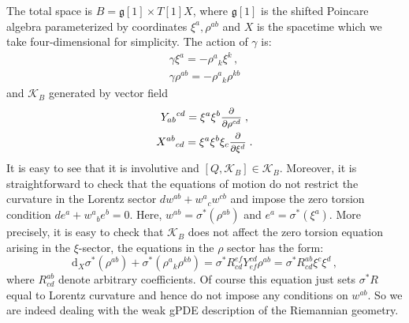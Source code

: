 \documentclass[a4paper,12pt]{article}
\numberwithin{equation}{section} %
\newcommand{\dx}{\mathrm{d}_X}
\renewcommand{\d}{\partial}
\newcommand{\ffrac}[2]{\raisebox{.5pt}%
  {\footnotesize$\displaystyle\frac{#1}{#2}$}\kern1pt}
\newcommand{\ddl}[2]{\ffrac{\d #1}{\d #2}}
\def\cK{\mathcal{K}}
\newcommand{\lorcon}{w}
\begin{document}
The total space is $B = \mathfrak{g}[1] \times T[1]X$, where $\mathfrak{g}[1]$ is the shifted Poincare algebra parameterized by coordinates $\xi^a, \rho^{ab}$ and $X$ is the spacetime which we take four-dimensional for simplicity. The action of $\gamma$ is:
\begin{equation}
    \begin{gathered}
        \gamma \xi^a = -\rho^{a}{ }_k \xi^k\,, \\
        \gamma \rho^{ab} = -\rho^{a}{ }_k \rho^{kb}
    \end{gathered}
\end{equation}
and $\cK_B$ generated by vector field
\begin{equation} \label{K-Riemann}
\begin{gathered}
    Y_{ab}{ }^{cd} = \xi^a \xi^b \ddl{}{\rho^{cd}} \,,\\
    X^{ab}{ }_{cd} = \xi^a \xi^b \xi_c \ddl{}{\xi^d}\,.
\end{gathered}
\end{equation}
It is easy to see that it is involutive and $[Q,\cK_B] \in \cK_B$. Moreover, it is straightforward to check that the equations of motion do not restrict the curvature in the Lorentz sector $d\lorcon^{ab}+\lorcon^{a}{}_c\lorcon^{cb}$ and impose the zero torsion condition $de^a+\lorcon^a{}_{b} e^b=0$. Here, $\lorcon^{ab}=\sigma^*(\rho^{ab})$ and $e^a=\sigma^*(\xi^{a})$. More precisely, it is easy to check that $\cK_B$ does not affect the zero torsion equation arising in the $\xi$-sector, the equations in the $\rho$ sector has the form:
\begin{equation}
\dx\sigma^*(\rho^{ab}) + \sigma^*(\rho^a{}_k \rho^{kb})=\sigma^*{}R^{ef}_{cd}Y^{cd}_{ef}\rho^{ab}=
\sigma^*{}R^{ab}_{cd}\xi^c\xi^d\,,
\end{equation}
where $R^{ab}_{cd}$ denote arbitrary coefficients. Of course this equation just sets $\sigma^* R$ equal to Lorentz curvature and hence do not impose any conditions on $\lorcon^{ab}$. So we are indeed dealing with the weak gPDE description of the Riemannian geometry. 
\end{document}
